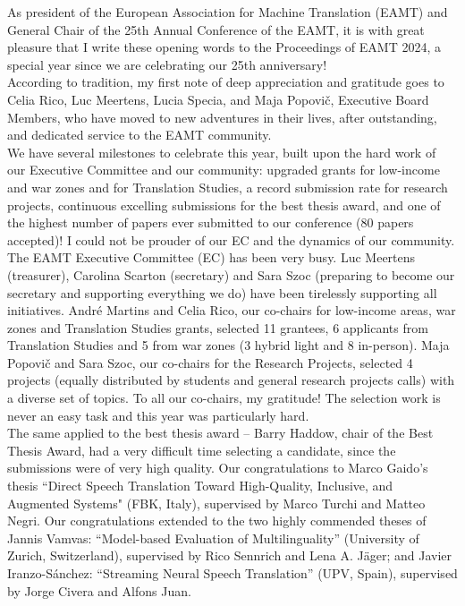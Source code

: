 As president of the European Association for Machine Translation (EAMT) and General Chair of the 25th Annual Conference of the EAMT, it is with great pleasure that I write these opening words to the Proceedings of EAMT 2024, a special year since we are celebrating our 25th anniversary!
\\

According to tradition, my first note of deep appreciation and gratitude goes to Celia Rico, Luc Meertens, Lucia Specia, and Maja Popovič, Executive Board Members, who have moved to new adventures in their lives, after outstanding, and dedicated service to the EAMT community.
\\

We have several milestones to celebrate this year, built upon the hard work of our Executive Committee and our community: upgraded grants for low-income and war zones and for Translation Studies, a record submission rate for research projects, continuous excelling submissions for the best thesis award, and one of the highest number of papers ever submitted to our conference (80 papers accepted)! I could not be prouder of our EC and the dynamics of our community.
\\

The EAMT Executive Committee (EC) has been very busy. Luc Meertens (treasurer), Carolina Scarton (secretary) and Sara Szoc (preparing to become our secretary and supporting everything we do) have been tirelessly supporting all initiatives. André Martins and Celia Rico, our co-chairs for low-income areas, war zones and Translation Studies grants, selected 11 grantees, 6 applicants from Translation Studies and 5 from war zones (3 hybrid light and 8 in-person). Maja Popovič and Sara Szoc, our co-chairs for the Research Projects, selected 4  projects (equally distributed by students and general research projects calls) with a diverse set of topics. To all our co-chairs, my gratitude! The selection work is never an easy task and this year was particularly hard. 
\\

The same applied to the best thesis award –  Barry Haddow, chair of the Best Thesis Award, had a very difficult time selecting a candidate, since the submissions were of very high quality. Our congratulations to Marco Gaido's thesis “Direct Speech Translation Toward High-Quality, Inclusive, and Augmented Systems" (FBK, Italy), supervised by Marco Turchi and Matteo Negri. Our congratulations extended to the two highly commended theses of Jannis Vamvas: “Model-based Evaluation of Multilinguality” (University of Zurich, Switzerland), supervised by Rico Sennrich and Lena A. Jäger; and Javier Iranzo-Sánchez: “Streaming Neural Speech Translation” (UPV, Spain), supervised by Jorge Civera and Alfons Juan. 
\\

